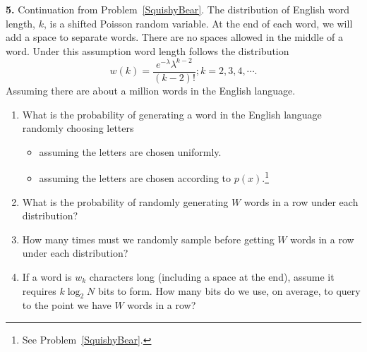 \textbf{5.} \label{NewToyYoda}
Continuation from Problem~\ref{SquishyBear}.
The distribution of English word length, $k$, is a shifted Poisson random variable. At the end of each word, we will add a space to separate words. There are no spaces allowed in the middle of a word. Under this assumption word length follows the distribution
$$ w(k)=\frac{e^{-\lambda}\lambda^{k-2} }{(k-2)!} ; k=2,3,4,\cdots.$$
Assuming there are about a million words in the English language.
\begin{enumerate}
\item What is the probability of generating a word in the English language randomly choosing letters
  \begin{itemize}
  \item assuming the letters are chosen uniformly.
  \item assuming the letters are chosen according to $p(x)$.\footnote{
      See Problem~\ref{SquishyBear}.
    }
  \end{itemize}
\item What is the probability of randomly generating $W$ words in a row under each distribution?
\item How many times must we randomly sample before getting $W$ words in a row under each distribution?
\item If a word is $w_k$ characters long (including a space at the end), assume it requires $k \log_2 N$ bits to form. How many bits do we use, on average, to query to the point we have $W$ words in a row?
\end{enumerate}
